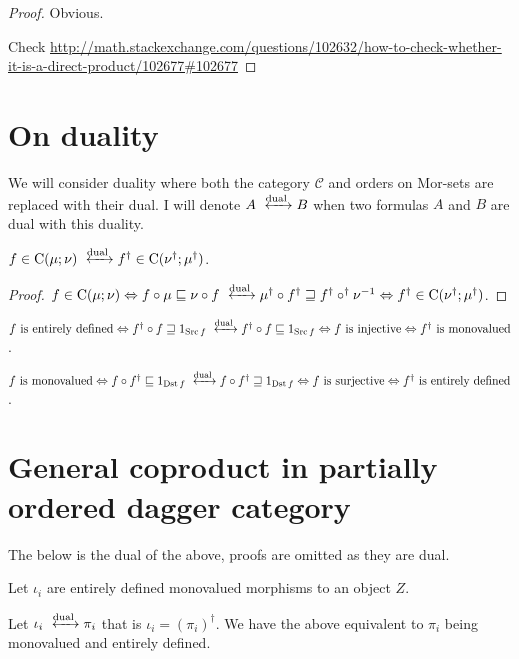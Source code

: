 \begin{proof}
  Obvious.
  
  Check
  \url{http://math.stackexchange.com/questions/102632/how-to-check-whether-it-is-a-direct-product/102677\#102677}
\end{proof}

\section{On duality}

We will consider duality where both the category $\mathcal{C}$ and orders on
Mor-sets are replaced with their dual. I will denote $A
\xleftrightarrow{\dual} B$ when two formulas $A$ and $B$ are dual with
this duality.

\begin{prop}
  $f \in \mathrm{C} (\mu; \nu) \xleftrightarrow{\dual} f^{\dagger}
  \in \mathrm{C} (\nu^{\dagger} ; \mu^{\dagger})$.
\end{prop}

\begin{proof}
  $f \in \mathrm{C} (\mu; \nu) \Leftrightarrow f \circ \mu
  \sqsubseteq \nu \circ f \xleftrightarrow{\dual} \mu^{\dagger}
  \circ f^{\dagger} \sqsupseteq f^{\dagger} \circ^{\dagger} \nu^{- 1}
  \Leftrightarrow f^{\dagger} \in \mathrm{C} (\nu^{\dagger} ;
  \mu^{\dagger})$.
\end{proof}

$f \text{ is entirely defined} \Leftrightarrow f^{\dagger} \circ f \sqsupseteq
1_{\Src f} \xleftrightarrow{\dual} f^{\dagger} \circ f \sqsubseteq
1_{\Src f} \Leftrightarrow f \text{ is injective} \Leftrightarrow
f^{\dagger} \text{ is monovalued}$.

$f \text{ is monovalued} \Leftrightarrow f \circ f^{\dagger} \sqsubseteq
1_{\Dst f} \xleftrightarrow{\dual} f \circ f^{\dagger} \sqsupseteq
1_{\Dst f} \Leftrightarrow f \text{ is surjective} \Leftrightarrow
f^{\dagger} \text{ is entirely defined}$.

\section{General coproduct in partially ordered dagger category}

The below is the dual of the above, proofs are omitted as they are dual.

Let $\iota_i$  are entirely defined monovalued morphisms to an object $Z$.

Let $\iota_i \xleftrightarrow{\dual} \pi_i$ that is $\iota_i =
(\pi_i)^{\dagger}$. We have the above equivalent to $\pi_i$ being monovalued
and entirely defined.

